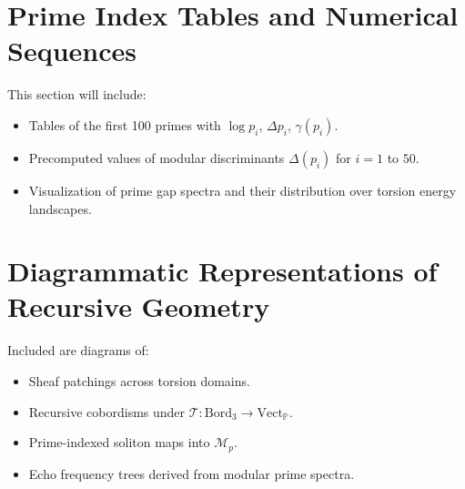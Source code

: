 \documentclass{article}
\theoremstyle{plain}
\begin{document}
\section{Prime Index Tables and Numerical Sequences}

This section will include:
\begin{itemize}
    \item Tables of the first 100 primes with $\log p_i$, $\Delta p_i$, $\gamma(p_i)$.
    \item Precomputed values of modular discriminants $\Delta(p_i)$ for $i = 1$ to $50$.
    \item Visualization of prime gap spectra and their distribution over torsion energy landscapes.
\end{itemize}

\section{Diagrammatic Representations of Recursive Geometry}

Included are diagrams of:
\begin{itemize}
    \item Sheaf patchings across torsion domains.
    \item Recursive cobordisms under $\mathcal{T}: \text{Bord}_3 \to \text{Vect}_{\mathbb{P}}$.
    \item Prime-indexed soliton maps into $\mathcal{M}_p$.
    \item Echo frequency trees derived from modular prime spectra.
\end{itemize}


\nocite{*}


\end{document}
